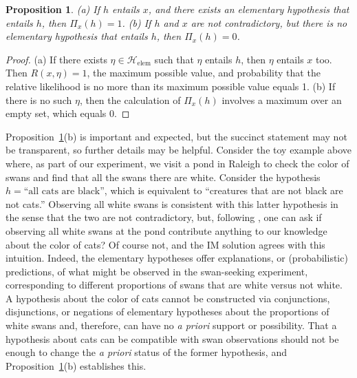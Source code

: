 \documentclass[a4paper, 12pt]{article}
\theoremstyle{plain}
\newtheorem{prop}{Proposition}
\theoremstyle{definition}
\theoremstyle{remark}
\renewcommand{\H}{\mathcal{H}}
\newcommand{\uPi}{\mathsf{\Pi}}%
\begin{document}
\begin{prop}
\label{prop:upi.noamp}
{\rm (a)} If $h$ entails $x$, and there exists an elementary hypothesis that entails $h$, then $\uPi_x(h)=1$. {\rm (b)} If $h$ and $x$ are not contradictory, but there is no elementary hypothesis that entails $h$, then $\uPi_x(h) = 0$. 
\end{prop}

\begin{proof}
(a) If there exists $\eta \in \H_\text{elem}$ such that $\eta$ entails $h$, then $\eta$ entails $x$ too.  Then $R(x,\eta)=1$, the maximum possible value, and probability that the relative likelihood is no more than its maximum possible value equals 1.  (b) If there is no such $\eta$, then the calculation of $\uPi_x(h)$ involves a maximum over an empty set, which equals 0. 
\end{proof}

Proposition~\ref{prop:upi.noamp}(b) is important and expected, but the succinct statement may not be transparent, so further details may be helpful. Consider the toy example above where, as part of our experiment, we visit a pond in Raleigh to check the color of swans and find that all the swans there are white.  Consider the hypothesis $h = \text{``all cats are black''}$, which is equivalent to ``creatures that are not black are not cats.''  Observing all white swans is consistent with this latter hypothesis in the sense that the two are not contradictory, but, following \citet{hempel1945.1}, one can ask if observing all white swans at the pond contribute anything to our knowledge about the color of cats?  Of course not, and the IM solution agrees with this intuition.  Indeed, the elementary hypotheses offer explanations, or (probabilistic) predictions, of what might be observed in the swan-seeking experiment, corresponding to different proportions of swans that are white versus not white.  A hypothesis about the color of cats cannot be constructed via conjunctions, disjunctions, or negations of elementary hypotheses about the proportions of white swans and, therefore, can have no {\em a priori} support or possibility.  That a hypothesis about cats can be compatible with swan observations should not be enough to change the {\em a priori} status of the former hypothesis, and Proposition~\ref{prop:upi.noamp}(b) establishes this. 
\end{document}
